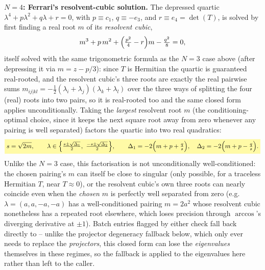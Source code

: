 \begin{theorybox}
\textbf{$N=4$: Ferrari's resolvent-cubic solution.} The depressed quartic
$\lambda^4+p\lambda^2+q\lambda+r=0$, with $p\equiv c_1$, $q\equiv-e_3$, and
$r\equiv e_4=\det(T)$, is solved by first finding a real root $m$ of its
\emph{resolvent cubic},
\begin{equation}
  m^3 + p\,m^2 + \Bigl(\tfrac{p^2}{4}-r\Bigr)m - \tfrac{q^2}{8} = 0,
\end{equation}
itself solved with the same trigonometric formula as the $N=3$ case above
(after depressing it via $m=z-p/3$): since $T$ is Hermitian the quartic is
guaranteed real-rooted, and the resolvent cubic's three roots are exactly
the real pairwise sums
$m_{ij|kl}=-\tfrac12(\lambda_i+\lambda_j)(\lambda_k+\lambda_l)$ over the
three ways of splitting the four (real) roots into two pairs, so it is
real-rooted too and the same closed form applies unconditionally. Taking
the \emph{largest} resolvent root $m$ (the conditioning-optimal choice,
since it keeps the next square root away from zero whenever any pairing is
well separated) factors the quartic into two real quadratics:
\begin{equation}
  \keyresult{
    s=\sqrt{2m}, \qquad
    \lambda \in \Bigl\{\tfrac{s\pm\sqrt{\Delta_1}}{2},\ \tfrac{-s\pm\sqrt{\Delta_2}}{2}\Bigr\},
    \qquad
    \Delta_1 = -2\Bigl(m+p+\tfrac{q}{s}\Bigr), \quad
    \Delta_2 = -2\Bigl(m+p-\tfrac{q}{s}\Bigr).
  }
\end{equation}
Unlike the $N=3$ case, this factorisation is not unconditionally
well-conditioned: the chosen pairing's $m$ can itself be close to singular
(only possible, for a traceless Hermitian $T$, near $T\approx0$), or the
resolvent cubic's own three roots can nearly coincide even when the
\emph{chosen} $m$ is perfectly well separated from zero (e.g.\
$\lambda=(a,a,-a,-a)$ has a well-conditioned pairing $m=2a^2$ whose
resolvent cubic nonetheless has a repeated root elsewhere, which loses
precision through $\arccos$'s diverging derivative at $\pm1$). Batch
entries flagged by either check fall back directly to
 -- unlike the projector degeneracy fallback
below, which only ever needs to replace the \emph{projectors}, this
closed form can lose the \emph{eigenvalues} themselves in these regimes,
so the fallback is applied to the eigenvalues here rather than left to the
caller.
\end{theorybox}

